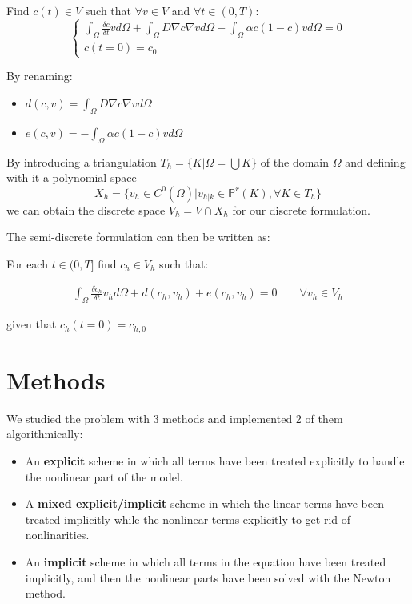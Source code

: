\documentclass[12pt, letterpaper]{article}
\begin{document}
\vspace{1em}
\noindent Find $c(t)\in V$ such that $\forall v\in V$ and $\forall t\in(0,T)$:
$$\begin{cases}\int_\Omega\frac{\delta c}{\delta t}vd\Omega+\int_\Omega D\nabla c\nabla vd\Omega-\int_\Omega\alpha c(1-c)vd\Omega=0\\c(t=0)=c_0\end{cases}$$

\vspace{1em}
\noindent By renaming:
\begin{itemize}
    \item $d(c,v)=\int_\Omega D\nabla c\nabla vd\Omega$
    \item $e(c,v)=-\int_\Omega\alpha c(1-c)vd\Omega$
\end{itemize}

\noindent By introducing a triangulation $T_h=\{K|\Omega=\bigcup K\}$ of the domain $\Omega$ and defining with it a polynomial space $$X_h=\{v_h\in C^0(\bar\Omega)|v_{h|k}\in\mathbb{P}^r(K),\forall K\in T_h\}$$ we can obtain the discrete space $V_h=V\cap X_h$ for our discrete formulation.

\noindent The semi-discrete formulation can then be written as:

\vspace{1em}
\noindent
For each $t\in(0,T]$ find $c_h\in V_h$ such that:

\notag \begin{gather}
\int_\Omega\frac{\delta c_h}{\delta t}v_hd\Omega+d(c_h,v_h)+e(c_h,v_h)=0    
\qquad \forall v_h\in V_h
\end{gather}

\noindent given that $c_h(t=0)=c_{h,0}$

\section{Methods}

We studied the problem with 3 methods and implemented 2 of them algorithmically:
\begin{itemize}
    \item An \textbf{explicit} scheme in which all terms have been treated explicitly to handle the nonlinear part of the model.
    \item A \textbf{mixed explicit/implicit} scheme in which the linear terms have been treated implicitly while the nonlinear terms explicitly to get rid of nonlinarities.
    \item An \textbf{implicit} scheme in which all terms in the equation have been treated implicitly, and then the nonlinear parts have been solved with the Newton method.
\end{itemize}
\end{document}
